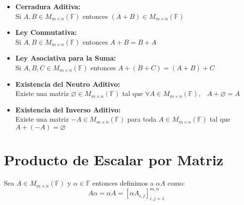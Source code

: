 \documentclass[12pt]{report}                                    %
\DeclareMathOperator \Space {\quad}                             %
\DeclareMathOperator \MiniSpace {\;}                            %
\begin{document}
                \begin{itemize}

                    \item \textbf{Cerradura Aditiva:}\\
                        Si $A, B \in M_{m \times n}(\mathbb{F})$ entonces 
                        $(A+B) \in M_{m \times n}(\mathbb{F})$


                    \item \textbf{Ley Conmutativa:}\\
                        Si $A, B \in M_{m \times n}(\mathbb{F})$ entonces $A+B = B+A$

                    \item \textbf{Ley Asociativa para la Suma:}\\
                        Si $A, B, C \in M_{m \times n}(\mathbb{F})$ entonces 
                        $A + (B+C) = (A+B) + C$

                    \item \textbf{Existencia del Neutro Aditivo:}\\
                        Existe una matriz $\varnothing \in M_{m \times n}(\mathbb{F})$
                        tal que $\forall A \in M_{m \times n}(\mathbb{F}), \MiniSpace A + \varnothing = A$

                    \item \textbf{Existencia del Inverso Aditivo:}\\
                        Existe una matriz $-A \in M_{m \times n}(\mathbb{F})$ para toda 
                        $A \in M_{m \times n}(\mathbb{F})$ tal que $ A + (-A) = \varnothing$

                \end{itemize}




        \clearpage
        \section{Producto de Escalar por Matriz}

            Sea $A \in M_{m \times n}(\mathbb{F})$ y $\alpha \in \mathbb{F}$ entonces 
            definimos a $ \alpha A$ como:
            \begin{equation}
                A \alpha = \alpha A = [\alpha A_{i, j}]_{i, j = 1}^{m, n}
            \end{equation}
\end{document}
